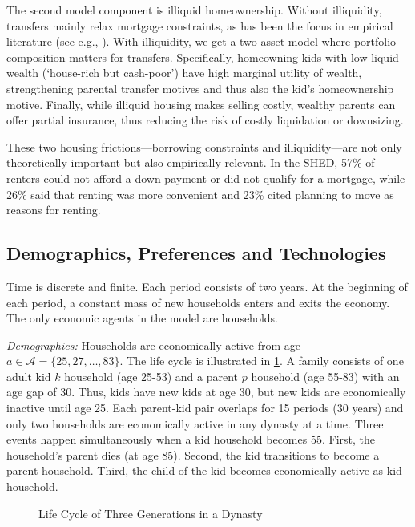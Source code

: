 \documentclass[12pt]{article}
\begin{document}
The second model component is illiquid homeownership. Without illiquidity, transfers mainly relax mortgage constraints, as has been the focus in empirical literature (see e.g., \cite{Blickle2019,Engelhardt1998,Guiso2002,Lee2018}). With illiquidity, we get a two-asset model where portfolio composition matters for transfers. Specifically, homeowning kids with low liquid wealth (`house-rich but cash-poor') have high marginal utility of wealth, strengthening parental transfer motives and thus also the kid's homeownership motive. Finally, while illiquid housing makes selling costly, wealthy parents can offer partial insurance, thus reducing the risk of costly liquidation or downsizing.

These two housing frictions---borrowing constraints and illiquidity---are not only theoretically important but also empirically relevant. In the SHED, 57\% of renters could not afford a down-payment or did not qualify for a mortgage, while 26\% said that renting was more convenient and 23\% cited planning to move as reasons for renting. 

\subsection{Demographics, Preferences and Technologies}
Time is discrete and finite. Each period consists of two years. At the beginning of each period, a constant mass of new households enters and exits the economy. The only economic agents in the model are households.

\textit{Demographics:} Households are economically active from age $a\in \mathcal{A}=\{25,\allowbreak 27,\allowbreak\dots,\allowbreak 83\}$. The life cycle is illustrated in \ref{fig:overview}. A family consists of one adult kid $k$ household (age 25-53) and a parent $p$ household (age 55-83) with an age gap of 30. Thus, kids have new kids at age 30, but new kids are economically inactive until age 25. Each parent-kid pair overlaps for 15 periods (30 years) and only two households are economically active in any dynasty at a time. Three events happen simultaneously when a kid household becomes 55. First, the household's parent dies (at age 85). Second, the kid transitions to become a parent household. Third, the child of the kid becomes economically active as kid household.

\begin{figure}\begin{center}
	\caption{Life Cycle of Three Generations in a Dynasty }\label{fig:overview}
	
\end{center}
\end{figure} 
\end{document}
